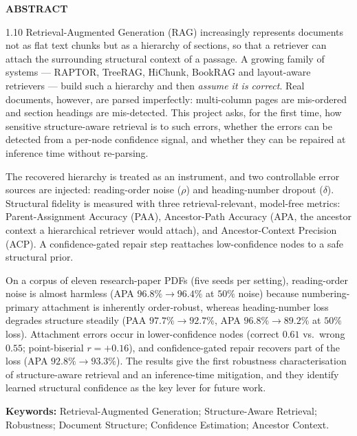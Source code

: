 \documentclass[12pt,a4paper]{report}
\begin{document}
\setcounter{page}{1}
\begin{center}{\Large\bfseries ABSTRACT}\end{center}\vspace{2mm}
\begin{spacing}{1.10}
\noindent
Retrieval-Augmented Generation (RAG) increasingly represents documents not as flat text chunks
but as a hierarchy of sections, so that a retriever can attach the surrounding structural context
of a passage. A growing family of systems --- RAPTOR, TreeRAG, HiChunk, BookRAG and layout-aware
retrievers --- build such a hierarchy and then \emph{assume it is correct}. Real documents, however,
are parsed imperfectly: multi-column pages are mis-ordered and section headings are mis-detected.
This project asks, for the first time, how sensitive structure-aware retrieval is to such errors,
whether the errors can be detected from a per-node confidence signal, and whether they can be
repaired at inference time without re-parsing.

The recovered hierarchy is treated as an instrument, and two controllable error sources are
injected: reading-order noise ($\rho$) and heading-number dropout ($\delta$). Structural fidelity
is measured with three retrieval-relevant, model-free metrics: Parent-Assignment Accuracy (PAA),
Ancestor-Path Accuracy (APA, the ancestor context a hierarchical retriever would attach), and
Ancestor-Context Precision (ACP). A confidence-gated repair step reattaches low-confidence nodes
to a safe structural prior.

On a corpus of eleven research-paper PDFs (five seeds per setting), reading-order noise is almost
harmless (APA $96.8\% \rightarrow 96.4\%$ at $50\%$ noise) because numbering-primary attachment is
inherently order-robust, whereas heading-number loss degrades structure steadily (PAA
$97.7\%\rightarrow 92.7\%$, APA $96.8\%\rightarrow 89.2\%$ at $50\%$ loss). Attachment errors occur
in lower-confidence nodes (correct $0.61$ vs.\ wrong $0.55$; point-biserial $r=+0.16$), and
confidence-gated repair recovers part of the loss (APA $92.8\%\rightarrow 93.3\%$). The results
give the first robustness characterisation of structure-aware retrieval and an inference-time
mitigation, and they identify learned structural confidence as the key lever for future work.

\vspace{3mm}\noindent\textbf{Keywords:} Retrieval-Augmented Generation; Structure-Aware Retrieval;
Robustness; Document Structure; Confidence Estimation; Ancestor Context.
\end{spacing}
\clearpage
\end{document}
